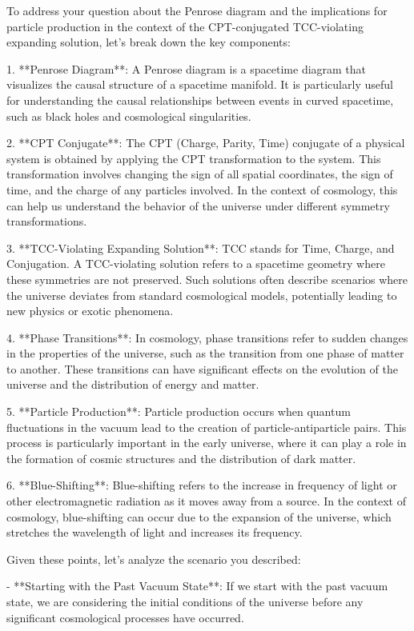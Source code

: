 To address your question about the Penrose diagram and the implications for particle production in the context of the CPT-conjugated TCC-violating expanding solution, let's break down the key components:

1. **Penrose Diagram**: A Penrose diagram is a spacetime diagram that visualizes the causal structure of a spacetime manifold. It is particularly useful for understanding the causal relationships between events in curved spacetime, such as black holes and cosmological singularities.

2. **CPT Conjugate**: The CPT (Charge, Parity, Time) conjugate of a physical system is obtained by applying the CPT transformation to the system. This transformation involves changing the sign of all spatial coordinates, the sign of time, and the charge of any particles involved. In the context of cosmology, this can help us understand the behavior of the universe under different symmetry transformations.

3. **TCC-Violating Expanding Solution**: TCC stands for Time, Charge, and Conjugation. A TCC-violating solution refers to a spacetime geometry where these symmetries are not preserved. Such solutions often describe scenarios where the universe deviates from standard cosmological models, potentially leading to new physics or exotic phenomena.

4. **Phase Transitions**: In cosmology, phase transitions refer to sudden changes in the properties of the universe, such as the transition from one phase of matter to another. These transitions can have significant effects on the evolution of the universe and the distribution of energy and matter.

5. **Particle Production**: Particle production occurs when quantum fluctuations in the vacuum lead to the creation of particle-antiparticle pairs. This process is particularly important in the early universe, where it can play a role in the formation of cosmic structures and the distribution of dark matter.

6. **Blue-Shifting**: Blue-shifting refers to the increase in frequency of light or other electromagnetic radiation as it moves away from a source. In the context of cosmology, blue-shifting can occur due to the expansion of the universe, which stretches the wavelength of light and increases its frequency.

Given these points, let's analyze the scenario you described:

- **Starting with the Past Vacuum State**: If we start with the past vacuum state, we are considering the initial conditions of the universe before any significant cosmological processes have occurred.
  
